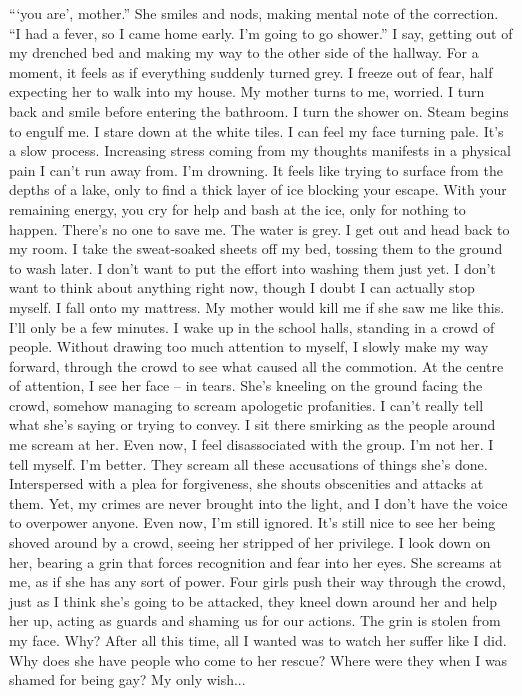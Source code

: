 \documentclass[a4paper, 12pt]{book}
\begin{document}
\begin{CJK*}{UTF8}{min}
\tab
```you are', mother.'' She smiles and nods, making mental note of the correction. ``I had a fever, so I came home early. I’m going to go shower.'' I say, getting out of my drenched bed and making my way to the other side of the hallway. For a moment, it feels as if everything suddenly turned grey. I freeze out of fear, half expecting her to walk into my house. My mother turns to me, worried. I turn back and smile before entering the bathroom.
\newline
\tab
I turn the shower on. Steam begins to engulf me. I stare down at the white tiles. I can feel my face turning pale. It’s a slow process. Increasing stress coming from my thoughts manifests in a physical pain I can’t run away from. I’m drowning. It feels like trying to surface from the depths of a lake, only to find a thick layer of ice blocking your escape. With your remaining energy, you cry for help and bash at the ice, only for nothing to happen. There’s no one to save me. The water is grey.
\newline
\tab
I get out and head back to my room. I take the sweat-soaked sheets off my bed, tossing them to the ground to wash later. I don’t want to put the effort into washing them just yet. I don’t want to think about anything right now, though I doubt I can actually stop myself. I fall onto my mattress. My mother would kill me if she saw me like this. I’ll only be a few minutes.
\newline
\tab
I wake up in the school halls, standing in a crowd of people. Without drawing too much attention to myself, I slowly make my way forward, through the crowd to see what caused all the commotion. At the centre of attention, I see her face -- in tears. She’s kneeling on the ground facing the crowd, somehow managing to scream apologetic profanities. I can’t really tell what she’s saying or trying to convey. I sit there smirking as the people around me scream at her. Even now, I feel disassociated with the group. I’m not her. I tell myself. I’m better. They scream all these accusations of things she’s done. Interspersed with a plea for forgiveness, she shouts obscenities and attacks at them. Yet, my crimes are never brought into the light, and I don’t have the voice to overpower anyone. Even now, I’m still ignored. It’s still nice to see her being shoved around by a crowd, seeing her stripped of her privilege. I look down on her, bearing a grin that forces recognition and fear into her eyes. She screams at me, as if she has any sort of power.
\newline
\tab
Four girls push their way through the crowd, just as I think she’s going to be attacked, they kneel down around her and help her up, acting as guards and shaming us for our actions. The grin is stolen from my face. Why? After all this time, all I wanted was to watch her suffer like I did. Why does she have people who come to her rescue? Where were they when I was shamed for being gay? My only wish...

\end{CJK*}
\end{document}
